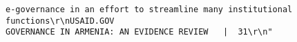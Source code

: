 \documentclass[
]{article}
\begin{document}
\begin{verbatim}
e-governance in an effort to streamline many institutional functions\r\nUSAID.GOV                                                     GOVERNANCE IN ARMENIA: AN EVIDENCE REVIEW   |  31\r\n"                                                                                                                                                                                                                                                                                                                                                                                                                                                                                                                                                                                                                                                                                                                                                                                                                                                                                                                                                                                                                                                                                                                                                                                                                                                                                                                                                                                                                                                                                                                                                                                             

\end{verbatim}
\end{document}
